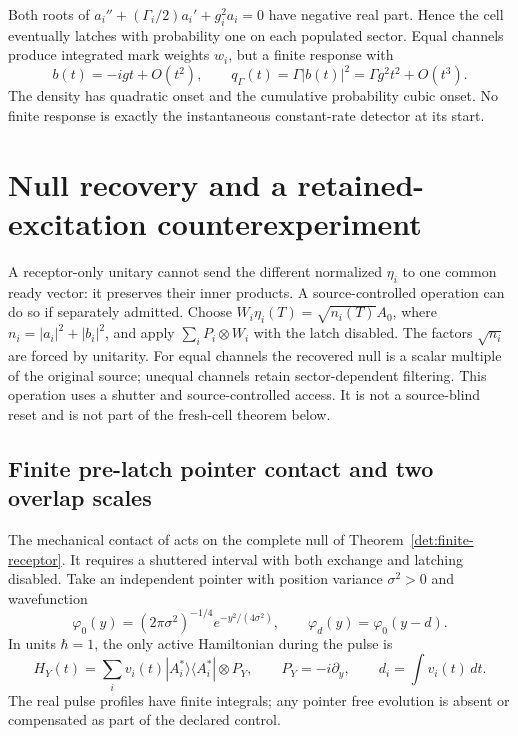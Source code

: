 \documentclass[11pt,oneside,openany]{book}
\theoremstyle{definition}
\theoremstyle{remark}\newtheorem{remark}[theorem]{Remark}
\begin{document}
Both roots of
$a_i''+(\Gamma_i/2)a_i'+g_i^2a_i=0$
have negative real part. Hence the cell eventually latches with
probability one on each populated sector. Equal channels produce
integrated mark weights $w_i$, but a finite response with
\[
 b(t)=-igt+O(t^2),\qquad
 q_\Gamma(t)=\Gamma|b(t)|^2=\Gamma g^2t^2+O(t^3).
\]
The density has quadratic onset and the cumulative probability cubic
onset. No finite response is exactly the instantaneous constant-rate
detector at its start.

\section{Null recovery and a retained-excitation counterexperiment}

A receptor-only unitary cannot send the different normalized $\eta_i$
to one common ready vector: it preserves their inner products. A
source-controlled operation can do so if separately admitted. Choose
$W_i\eta_i(T)=\sqrt{n_i(T)}A_0$, where
$n_i=|a_i|^2+|b_i|^2$, and apply
$\sum_iP_i\otimes W_i$ with the latch disabled. The factors
$\sqrt{n_i}$ are forced by unitarity. For equal channels the recovered
null is a scalar multiple of the original source; unequal channels
retain sector-dependent filtering. This operation uses a shutter and
source-controlled access. It is not a source-blind reset and is not
part of the fresh-cell theorem below.

\subsection{Finite pre-latch pointer contact and two overlap scales}
\label{det:pointer-contact}

The mechanical contact of \cite[\S14]{C01} acts on the complete null
of Theorem~\ref{det:finite-receptor}. It requires a shuttered interval
with both exchange and latching disabled. Take an independent pointer
with position variance $\sigma^2>0$ and wavefunction
\[
 \varphi_0(y)=(2\pi\sigma^2)^{-1/4}e^{-y^2/(4\sigma^2)},
 \qquad \varphi_d(y)=\varphi_0(y-d).
\]
In units $\hbar=1$, the only active Hamiltonian during the pulse is
\begin{equation}
 H_Y(t)=\sum_i v_i(t)|A_i^*\rangle\langle A_i^*|\otimes P_Y,
 \qquad P_Y=-i\partial_y,\qquad d_i=\int v_i(t)\,dt.
 \label{det:pointer-pulse}
\end{equation}
The real pulse profiles have finite integrals; any pointer free
evolution is absent or compensated as part of the declared control.
\end{document}
